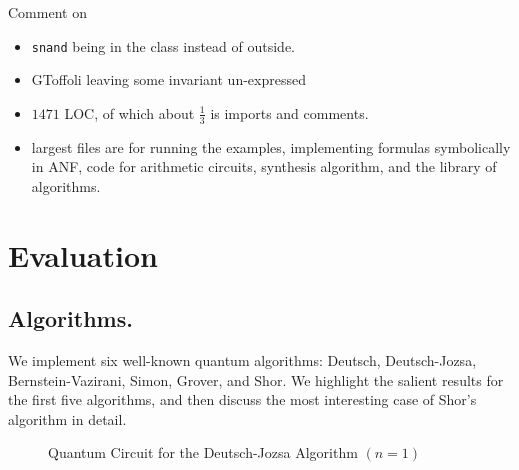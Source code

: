 \documentclass[sigplan]{acmart}
\begin{document}
Comment on
\begin{itemize}
  \item \texttt{snand} being in the class instead of outside.
  \item GToffoli leaving some invariant un-expressed
  \item $1471$ LOC, of which about $\frac{1}{3}$ is imports and comments.
  \item largest files are for running the examples, implementing formulas
    symbolically in ANF, code for arithmetic circuits, synthesis algorithm,
    and the library of algorithms.
\end{itemize}

\section{Evaluation}

\subsection*{Algorithms.} 

We implement six well-known quantum algorithms: 
Deutsch, Deutsch-Jozsa, Bernstein-Vazirani, Simon, Grover, and Shor. 
We highlight the salient results for the
first five algorithms, and then discuss the most interesting case of
Shor's algorithm in detail.

\begin{figure}[ht]
  \centering
{}
\caption{\label{fig:deutsch}Quantum Circuit for the Deutsch-Jozsa
  Algorithm $(n=1)$}
\end{figure}
\end{document}

